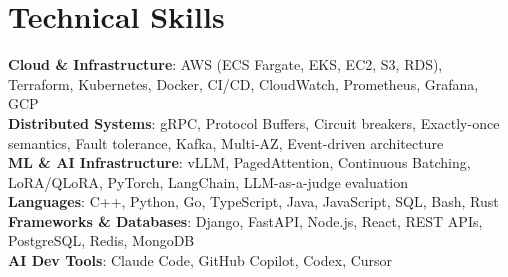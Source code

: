\documentclass[letterpaper,11pt]{article}
\begin{document}
\section{Technical Skills}
\vspace{-7pt}
\begin{itemize}
[leftmargin=0.15in, label={}]\small{\item{
        \textbf{Cloud \& Infrastructure}{: AWS (ECS Fargate, EKS, EC2, S3, RDS), Terraform, Kubernetes, Docker, CI/CD, CloudWatch, Prometheus, Grafana, GCP} \\
        \textbf{Distributed Systems}{: gRPC, Protocol Buffers, Circuit breakers, Exactly-once semantics, Fault tolerance, Kafka, Multi-AZ, Event-driven architecture} \\
        \textbf{ML \& AI Infrastructure}{: vLLM, PagedAttention, Continuous Batching, LoRA/QLoRA, PyTorch, LangChain, LLM-as-a-judge evaluation} \\
        \textbf{Languages}{: C++, Python, Go, TypeScript, Java, JavaScript, SQL, Bash, Rust} \\
        \textbf{Frameworks \& Databases}{: Django, FastAPI, Node.js, React, REST APIs, PostgreSQL, Redis, MongoDB} \\
        \textbf{AI Dev Tools}{: Claude Code, GitHub Copilot, Codex, Cursor} \\
}}
\end{itemize}
\end{document}
